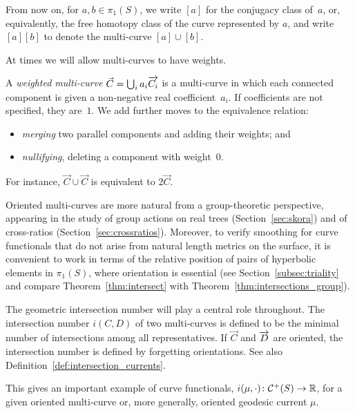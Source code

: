   \begin{notation*}
    From now on, for $a, b\in \pi_1(S)$, we write $[a]$ for the conjugacy class of~$a$, or, equivalently, the free homotopy class of the curve represented by $a$, and write $[a][b]$ to denote the multi-curve $[a] \cup [b]$.
  \end{notation*} 

At times we will allow multi-curves to have weights.

\begin{definition}\label{def:weighted-multi-curve}
  A \emph{weighted multi-curve} $\vec{C}=\bigcup_i a_i \overrightarrow{C_i}$ is a multi-curve in which each connected component is given a non-negative real coefficient~$a_i$. If coefficients are not specified, they are~$1$. We add further moves to the equivalence relation:
  \begin{itemize}
  \item \emph{merging} two parallel components and adding their weights; and
  \item \emph{nullifying}, deleting a
    component with weight~$0$.
  \end{itemize}
  For instance, $\vec{C} \cup \vec{C}$ is equivalent to $2\vec{C}$.
\end{definition}

Oriented multi-curves are more natural from a group-theoretic
perspective, appearing in
the study of group actions on real trees
(Section~\ref{sec:skora}) and
of cross-ratios
(Section~\ref{sec:crossratios}).
Moreover, to verify smoothing for curve functionals that do not arise from natural length metrics on the surface, it is convenient to work in terms of the relative position of pairs of hyperbolic elements in $\pi_1(S)$, where orientation is essential (see Section~\ref{subsec:triality} and compare Theorem~\ref{thm:intersect} with Theorem~\ref{thm:intersections_group}).

The geometric intersection number will play a central role throughout.
The intersection number $i(C,D)$ of two multi-curves is
defined to be the minimal number of intersections among all
representatives. If $\vec{C}$ and $\overrightarrow{D}$ are oriented,
the
intersection number is defined by forgetting orientations. See also
Definition~\ref{def:intersection_currents}.

This gives an important example of curve functionals, $i(\mu, \cdot) \colon
\mathcal{C}^+(S) \to \mathbb{R}$, for a given oriented multi-curve or,
more generally, oriented geodesic current $\mu$.


